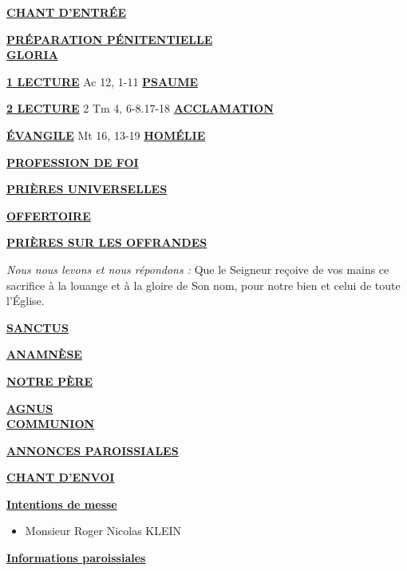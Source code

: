 \documentclass[french,11pt]{article}
\newcommand*{\chants}{../chants}
\newcommand*{\messe}{../messe_grace}
\newcommand*{\pu}{../pu}
\newcommand*{\psaumes}{../psaumes}
\newcommand{\NewsItem}[1]{%
\vspace{3pt}
\underline{\textbf{#1}}
		  }
\begin{document}
\NewsItem{CHANT D'ENTRÉE}
	

\NewsItem{PRÉPARATION PÉNITENTIELLE} \\
	

\NewsItem{GLORIA}
	


\NewsItem{1\iere{} LECTURE} Ac 12, 1-11
\hspace{2cm}
\NewsItem{PSAUME}


\NewsItem{2\ieme{} LECTURE}  2 Tm 4, 6-8.17-18
\NewsItem{ACCLAMATION}
%
\NewsItem{ÉVANGILE} Mt 16, 13-19
\NewsItem{HOMÉLIE}

\NewsItem{PROFESSION DE FOI}



\NewsItem{PRIÈRES UNIVERSELLES}

\NewsItem{OFFERTOIRE}

\NewsItem{PRIÈRES SUR LES OFFRANDES}
\textit{Nous nous levons et nous répondons : }
Que le Seigneur reçoive de vos mains ce sacrifice à la louange et à la gloire
de Son nom, pour notre bien et celui de toute l’Église.

\NewsItem{SANCTUS}


\NewsItem{ANAMNÈSE}


\NewsItem{NOTRE PÈRE}
\hspace{3cm}
\NewsItem{AGNUS} \\


\NewsItem{COMMUNION}


\NewsItem{ANNONCES PAROISSIALES}


\NewsItem{CHANT D'ENVOI}


\newpage


\NewsItem{Intentions de messe}
\begin{itemize}
\item[\Cross]
Monsieur Roger Nicolas KLEIN
\end{itemize}

\NewsItem{Informations paroissiales}
\end{document}
